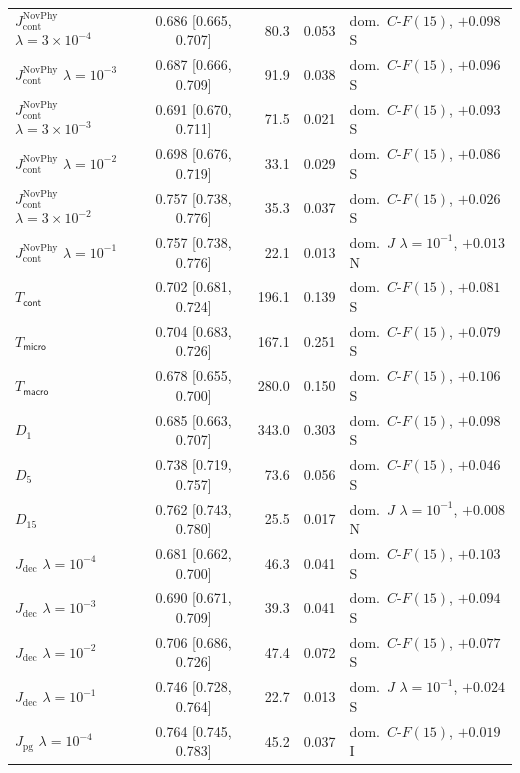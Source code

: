 {\begin{revblock}
\begin{longtable}{@{}lcrrl@{}}
$J_{\mathrm{cont}}^{\mathrm{NovPhy}}$ $\lambda{=}3{\times}10^{-4}$ & 0.686 [0.665, 0.707] & 80.3 & 0.053 & dom.\ $C\text{-}F(15)$, $+0.098$ S \\
$J_{\mathrm{cont}}^{\mathrm{NovPhy}}$ $\lambda{=}10^{-3}$ & 0.687 [0.666, 0.709] & 91.9 & 0.038 & dom.\ $C\text{-}F(15)$, $+0.096$ S \\
$J_{\mathrm{cont}}^{\mathrm{NovPhy}}$ $\lambda{=}3{\times}10^{-3}$ & 0.691 [0.670, 0.711] & 71.5 & 0.021 & dom.\ $C\text{-}F(15)$, $+0.093$ S \\
$J_{\mathrm{cont}}^{\mathrm{NovPhy}}$ $\lambda{=}10^{-2}$ & 0.698 [0.676, 0.719] & 33.1 & 0.029 & dom.\ $C\text{-}F(15)$, $+0.086$ S \\
$J_{\mathrm{cont}}^{\mathrm{NovPhy}}$ $\lambda{=}3{\times}10^{-2}$ & 0.757 [0.738, 0.776] & 35.3 & 0.037 & dom.\ $C\text{-}F(15)$, $+0.026$ S \\
$J_{\mathrm{cont}}^{\mathrm{NovPhy}}$ $\lambda{=}10^{-1}$ & 0.757 [0.738, 0.776] & 22.1 & 0.013 & dom.\ $J$ $\lambda{=}10^{-1}$, $+0.013$ N \\
$T_{\textsf{cont}}$ & 0.702 [0.681, 0.724] & 196.1 & 0.139 & dom.\ $C\text{-}F(15)$, $+0.081$ S \\
$T_{\textsf{micro}}$ & 0.704 [0.683, 0.726] & 167.1 & 0.251 & dom.\ $C\text{-}F(15)$, $+0.079$ S \\
$T_{\textsf{macro}}$ & 0.678 [0.655, 0.700] & 280.0 & 0.150 & dom.\ $C\text{-}F(15)$, $+0.106$ S \\
$D_{1}$ & 0.685 [0.663, 0.707] & 343.0 & 0.303 & dom.\ $C\text{-}F(15)$, $+0.098$ S \\
$D_{5}$ & 0.738 [0.719, 0.757] & 73.6 & 0.056 & dom.\ $C\text{-}F(15)$, $+0.046$ S \\
$D_{15}$ & 0.762 [0.743, 0.780] & 25.5 & 0.017 & dom.\ $J$ $\lambda{=}10^{-1}$, $+0.008$ N \\
$J_{\mathrm{dec}}$ $\lambda{=}10^{-4}$ & 0.681 [0.662, 0.700] & 46.3 & 0.041 & dom.\ $C\text{-}F(15)$, $+0.103$ S \\
$J_{\mathrm{dec}}$ $\lambda{=}10^{-3}$ & 0.690 [0.671, 0.709] & 39.3 & 0.041 & dom.\ $C\text{-}F(15)$, $+0.094$ S \\
$J_{\mathrm{dec}}$ $\lambda{=}10^{-2}$ & 0.706 [0.686, 0.726] & 47.4 & 0.072 & dom.\ $C\text{-}F(15)$, $+0.077$ S \\
$J_{\mathrm{dec}}$ $\lambda{=}10^{-1}$ & 0.746 [0.728, 0.764] & 22.7 & 0.013 & dom.\ $J$ $\lambda{=}10^{-1}$, $+0.024$ S \\
$J_{\mathrm{pg}}$ $\lambda{=}10^{-4}$ & 0.764 [0.745, 0.783] & 45.2 & 0.037 & dom.\ $C\text{-}F(15)$, $+0.019$ I \\

\end{longtable}
\end{revblock}}
